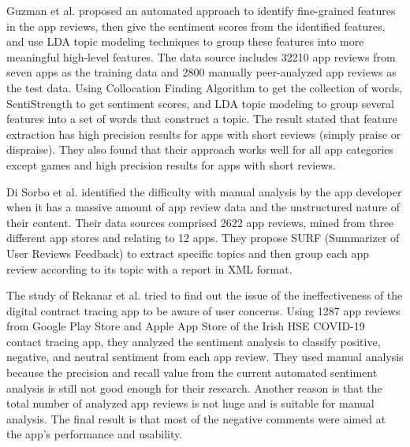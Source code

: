 \documentclass[12pt]{article}
\begin{document}
Guzman et al. \cite{fine_grained} proposed an automated approach to identify fine-grained features in the app reviews, then give the sentiment scores from the identified features, and use LDA topic modeling techniques to group these features into more meaningful high-level features. The data source includes 32210 app reviews from seven apps as the training data and 2800 manually peer-analyzed app reviews as the test data. Using Collocation Finding Algorithm to get the collection of words, SentiStrength to get sentiment scores, and LDA topic modeling to group several features into a set of words that construct a topic. The result stated that feature extraction has high precision results for apps with short reviews (simply praise or dispraise). They also found that their approach works well for all app categories except games and high precision results for apps with short reviews.

Di Sorbo et al. \cite{surf} identified the difficulty with manual analysis by the app developer when it has a massive amount of app review data and the unstructured nature of their content. Their data sources comprised 2622 app reviews, mined from three different app stores and relating to 12 apps. They propose SURF (Summarizer of User Reviews Feedback)  to extract specific topics and then group each app review according to its topic with a report in XML format.

The study of Rekanar et al. \cite{sentiment_analysis_hse_ireland} tried to find out the issue of the ineffectiveness of the digital contract tracing app to be aware of user concerns. Using 1287 app reviews from Google Play Store and Apple App Store of the Irish HSE COVID-19 contact tracing app, they analyzed the sentiment analysis to classify positive, negative, and neutral sentiment from each app review. They used manual analysis because the precision and recall value from the current automated sentiment analysis is still not good enough for their research. Another reason is that the total number of analyzed app reviews is not huge and is suitable for manual analysis. The final result is that most of the negative comments were aimed at the app’s performance and usability.
\end{document}
